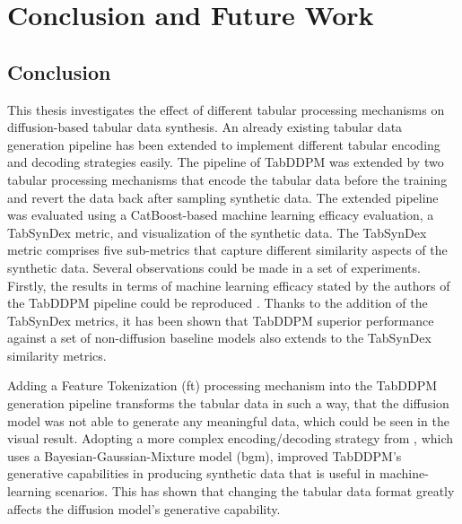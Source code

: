 \chapter{Conclusion and Future Work}
\label{ch:conclusion}

\section{Conclusion}
\label{ch:conclusion_}

This thesis investigates the effect of different tabular processing mechanisms on diffusion-based tabular data synthesis.
An already existing tabular data generation pipeline has been extended to implement different tabular encoding and decoding strategies easily.
The pipeline of TabDDPM \cite{kotelnikov2022TabDDPMModellingTabular} was extended by two tabular processing mechanisms that encode the tabular data before the training and revert the data back after sampling synthetic data.
The extended pipeline was evaluated using a CatBoost-based machine learning efficacy evaluation, a TabSynDex metric, and visualization of the synthetic data.
The TabSynDex metric comprises five sub-metrics that capture different similarity aspects of the synthetic data.
Several observations could be made in a set of experiments.
Firstly, the results in terms of machine learning efficacy stated by the authors of the TabDDPM pipeline could be reproduced \cite{kotelnikov2022TabDDPMModellingTabular}.
Thanks to the addition of the TabSynDex metrics, it has been shown that TabDDPM superior performance against a set of non-diffusion baseline models also extends to the TabSynDex similarity metrics.

Adding a Feature Tokenization (\gls{ft}) processing mechanism into the TabDDPM generation pipeline transforms the tabular data in such a way,
that the diffusion model was not able to generate any meaningful data, which could be seen in the visual result.
Adopting a more complex encoding/decoding strategy from \cite{zhao2022CTABGANEnhancingTabular}, which uses a Bayesian-Gaussian-Mixture model (\gls{bgm}),
improved TabDDPM's generative capabilities in producing synthetic data that is useful in machine-learning scenarios.
This has shown that changing the tabular data format greatly affects the diffusion model's generative capability.

